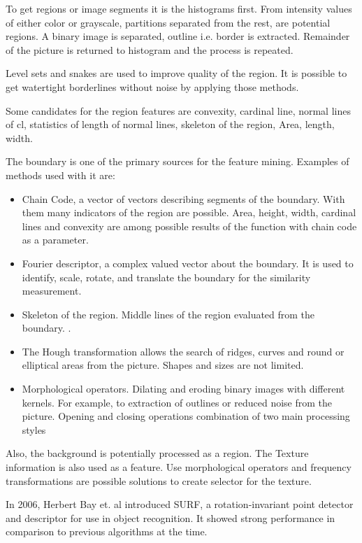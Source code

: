 \documentclass[doc/report.tex]{subfiles}
\begin{document}
To get regions or image segments it is the histograms first. From intensity
values of either color or grayscale, partitions separated from the rest, are
potential regions. A binary image is separated, outline i.e. border is
extracted. Remainder of the picture is returned to histogram and the process is
repeated.

Level sets and snakes are used to improve quality of the region. It is possible
to get watertight borderlines without noise by applying those methods.

Some candidates for the region features are convexity, cardinal line, normal
lines of cl, statistics of length of normal lines, skeleton of the region,
Area, length, width.

The boundary is one of the primary sources for the feature mining. Examples of
methods used with it are:

\begin{itemize}
    \item Chain Code, a vector of vectors describing segments of the boundary.
        With them many indicators of the region are possible. Area, height,
        width, cardinal lines and convexity are among possible results of the
        function with chain code as a parameter.
    \item Fourier descriptor, a complex valued vector about the boundary. It is
        used to identify, scale, rotate, and translate the boundary for the
        similarity measurement.
    \item Skeleton of the region. Middle lines of the region evaluated from the
        boundary. .
    \item The Hough transformation allows the search of ridges, curves and
        round or elliptical areas from the picture. Shapes and sizes are not
        limited.
    \item Morphological operators. Dilating and eroding binary images with
        different kernels. For example, to extraction of outlines or reduced
        noise from the picture. Opening and closing operations combination of
        two main processing styles
\end{itemize}

Also, the background is potentially processed as a region. The Texture
information is also used as a feature. Use morphological operators and
frequency transformations are possible solutions to create selector for the
texture.

In 2006, Herbert Bay et. al introduced SURF, a rotation-invariant point
detector and descriptor for use in object recognition.\cite{bay-surf} It showed
strong performance in comparison to previous algorithms at the time.
\end{document}
